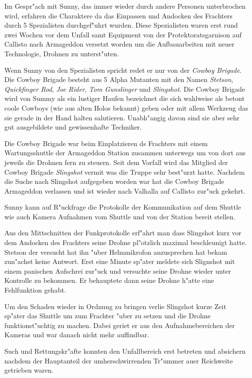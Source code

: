 Im Gespr"ach mit Sunny, das immer wieder durch andere Personen unterbrochen wird, erfahren die Charaktere da\3 das Einpassen und Andocken des Frachters durch 5 Spezialisten durchgef"uhrt wurden. Diese Spezialisten waren erst rund zwei Wochen vor dem Unfall samt Equipment von  der Protektoratsgarnison auf Callisto nach Armageddon versetzt worden um die Aufbauarbeiten mit neuer Technologie, Drohnen zu unterst"uten.

Wenn Sunny von den Spezialisten spricht redet er nur von der \emph{Cowboy Brigade}. Die Cowboy Brigade besteht aus 5 Alpha Mutanten mit den Namen \emph{Stetson}, \emph{Quickfinger Rod}, \emph{Joe Rider}, \emph{Tom Gunslinger} und \emph{Slingshot}. Die Cowboy Brigade wird von Summy als ein lustiger Haufen bezeichnet die sich wahlweise als betont coole Cowboys (wie aus alten Holos bekannt) geben oder mit allem Werkzeug das sie gerade in der Hand halten salutieren. Unabh"angig davon sind sie aber sehr gut ausgebildete und gewissenhafte Techniker.

Die Cowboy Brigade war beim Einplatzieren ds Frachters mit einem Wartungsshuttle der Armageddon Station zusammen unterwegs um von dort aus jeweils die Drohnen fern zu steuern. Seit dem Vorfall wird das Mitglied der Cowboy Brigade \emph{Slingshot} vermi\3t was die Truppe sehr best"urzt hatte. Nachdem die Suche nach Slingshot aufgegeben worden war hat die Cowboy Brigade Armageddon verlassen und ist wieder nach Valhalla auf Callisto zur"uck gekehrt.

Sunny kann auf R"uckfrage die Protokolle der Kommunikation auf dem Shuttle wie auch Kamera Aufnahmen vom Shuttle und von der Station bereit stellen.

Aus den Mittschnitten der Funkprotokolle erf"ahrt man dass Slingshot kurz vor dem Andocken des Frachters seine Drohne pl"otzlich maximal beschleunigt hatte. Stetson der versucht hat ihn "uber Helmmikrofon anzusprechen hat bekam zun"achst keine Antwort. Erst eine Minute sp"ater
meldete sich Slignshot mit einem panischen Aufschrei zur"uck und versuchte seine Drohne wieder unter Kontrolle zu bekommen. Er behauptete
dann seine Drohne h"atte eine Fehlfunktion gehabt.

Um den Schaden wieder in Ordnung zu bringen verlie\3 Slingshot kurze Zeit sp"ater das Shuttle um zum Frachter "uber zu setzen und die Drohne funktionst"uchtig zu machen. Dabei geriet er aus den Aufnahmebereichen der Kameras und war danach nicht mehr auffindbar.

Such und Rettungskr"afte konnten den Unfallbereich erst betreten und absichern nachdem der Hauptanteil der umherschwirrenden Tr"ummer au\3er Reichweite getrieben waren.

